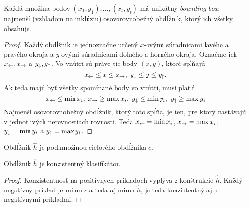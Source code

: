 \begin{lemma}
  Každá množina bodov $(x_1, y_1), \ldots, (x_t, y_t)$ má unikátny
  \emph{bounding box}: najmenší (vzhľadom na inklúziu) osovorovnobežný
  obdĺžnik, ktorý ich všetky obsahuje.
\end{lemma}
\begin{proof}
  Každý obdĺžnik je jednoznačne určený $x$-ovými súradnicami ľavého
  a pravého okraja a $y$-ovými súradnicami dolného a horného okraja.
  Označme ich $x_\leftarrow, x_\rightarrow$ a $y_\downarrow, y_\uparrow$.
  Vo vnútri sú práve tie body $(x, y)$, ktoré spĺňajú
  $$x_\larr \leq x \leq x_\rarr,\ y_\darr \leq y \leq y_\uarr.$$
  Ak teda majú byť všetky spomínané body vo vnútri, musí platiť
  $$
    x_\larr \leq \min x_i,\ 
    x_\rarr \geq \max x_i,\ 
    y_\darr \leq \min y_i,\ 
    y_\uarr \geq \max y_i
  $$
  Najmenší osovorovnobežný obdĺžnik, ktorý toto spĺňa, je ten, pre
  ktorý nastávajú v jednotlivých nerovnostiach rovnosti. Teda
  $x_\leftarrow = \min x_i$, $x_\rightarrow = \max x_i$, $y_\downarrow = \min y_i$ a $y_\uparrow = \max y_i$.
\end{proof}
\begin{corollary}
  Obdĺžnik $\hat{h}$ je podmnožinou cieľového obdĺžnika $c$.
\end{corollary}
\begin{corollary}
  Obdĺžnik $\hat{h}$ je konzistentný klasifikátor.
\end{corollary}
\begin{proof}
  Konzistentnosť na pozitívnych príkladoch vyplýva z konštrukcie $\hat{h}$.
  Každý negatívny príklad je mimo $c$ a teda aj mimo $\hat{h}$, je teda
  konzistentný aj s negatívnymi príkladmi.
\end{proof}


